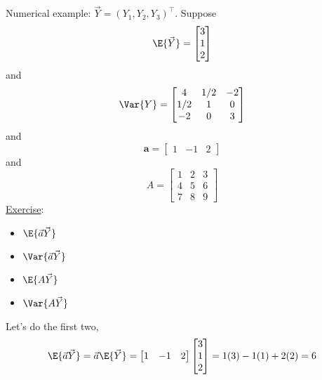 Numerical example: $ \vec{Y}=(Y_1,Y_2,Y_3)^\top $. Suppose
\[ \E{\vec{Y}}=\begin{bmatrix}
        3 \\
        1 \\
        2
    \end{bmatrix} \]
and
\[ \Var{Y}=\begin{bmatrix}
        4   & 1/2 & -2 \\
        1/2 & 1   & 0  \\
        -2  & 0   & 3
    \end{bmatrix} \]
and
\[ \symbf{a}=\begin{bmatrix}
        1 & -1 & 2
    \end{bmatrix} \]
and
\[ A=\begin{bmatrix}
        1 & 2 & 3 \\
        4 & 5 & 6 \\
        7 & 8 & 9
    \end{bmatrix} \]
\underline{Exercise}:
\begin{itemize}
    \item $ \E{\vec{a}\vec{Y}} $
    \item $ \Var{\vec{a}\vec{Y}} $
    \item $ \E{A\vec{Y}} $
    \item $ \Var{A\vec{Y}} $
\end{itemize}
Let's do the first two,
\[ \E{\vec{a}\vec{Y}}=\vec{a}\E{\vec{Y}}=
    \begin{bmatrix}
        1 & -1 & 2
    \end{bmatrix}\begin{bmatrix}
        3 \\
        1 \\
        2
    \end{bmatrix}=1(3)-1(1)+2(2)=6 \]
